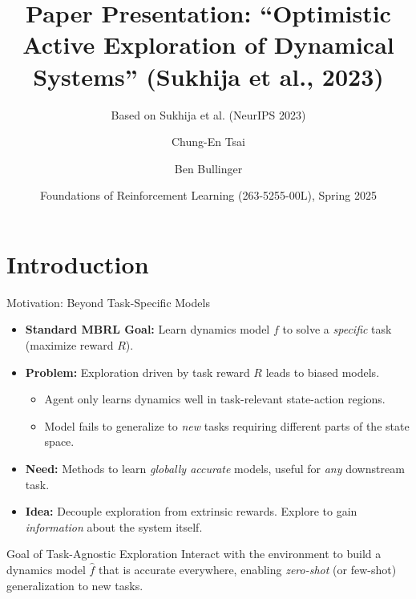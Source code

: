 \documentclass[11pt,aspectratio=169,handout]{beamer} %
\title{Paper Presentation: ``Optimistic Active Exploration of Dynamical Systems'' (Sukhija et al., 2023)}
\subtitle{Based on Sukhija et al. (NeurIPS 2023)} %
\author{Chung-En Tsai \and Ben Bullinger} %
\institute{ETH Zürich \\ Department of Computer Science}
\date[FoRL Spring 2025]{Foundations of Reinforcement Learning (263-5255-00L), Spring 2025} %
\begin{document}
\def\titlefigure{elements/title-page-image}  %
\setlength{\titleboxwidth}{0.85\textwidth} %
\titleframe %

\tocframe %

\section{Introduction}

\begin{frame}{Motivation: Beyond Task-Specific Models}
    \begin{itemize}
        \item \textbf{Standard MBRL Goal:} Learn dynamics model $f$ to solve a \textit{specific} task (maximize reward $R$).
        \item \textbf{Problem:} Exploration driven by task reward $R$ leads to biased models.
        \begin{itemize}
            \item Agent only learns dynamics well in task-relevant state-action regions.
            \item Model fails to generalize to \textit{new} tasks requiring different parts of the state space.
            \end{itemize}
        \item \textbf{Need:} Methods to learn \textit{globally accurate} models, useful for \textit{any} downstream task.
        \pause
        \item \textbf{Idea:} Decouple exploration from extrinsic rewards. Explore to gain \textit{information} about the system itself.
    \end{itemize}
    \vspace{1em}
    \begin{alertblock}{Goal of Task-Agnostic Exploration}
        Interact with the environment to build a dynamics model $\hat{f}$ that is accurate everywhere, enabling \textit{zero-shot} (or few-shot) generalization to new tasks.
    \end{alertblock}
\end{frame}
\end{document}
